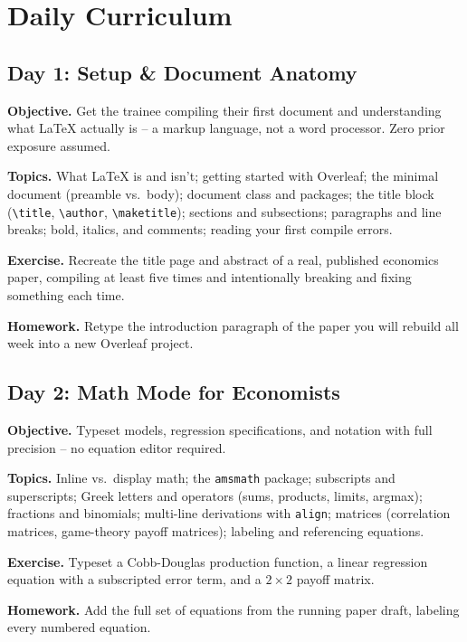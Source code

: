 \documentclass[11pt,a4paper]{article}
\begin{document}
\newpage
\section{Daily Curriculum}

\subsection*{Day 1: Setup \& Document Anatomy}
\textbf{Objective.} Get the trainee compiling their first document and
understanding what LaTeX actually is -- a markup language, not a word
processor. Zero prior exposure assumed.

\textbf{Topics.} What LaTeX is and isn't; getting started with
Overleaf; the minimal document (preamble vs.\ body); document class
and packages; the title block (\texttt{\textbackslash title},
\texttt{\textbackslash author}, \texttt{\textbackslash maketitle});
sections and subsections; paragraphs and line breaks; bold, italics,
and comments; reading your first compile errors.

\textbf{Exercise.} Recreate the title page and abstract of a real,
published economics paper, compiling at least five times and
intentionally breaking and fixing something each time.

\textbf{Homework.} Retype the introduction paragraph of the paper you
will rebuild all week into a new Overleaf project.

\vspace{6pt}
\subsection*{Day 2: Math Mode for Economists}
\textbf{Objective.} Typeset models, regression specifications, and
notation with full precision -- no equation editor required.

\textbf{Topics.} Inline vs.\ display math; the \texttt{amsmath}
package; subscripts and superscripts; Greek letters and operators
(sums, products, limits, argmax); fractions and binomials; multi-line
derivations with \texttt{align}; matrices (correlation matrices,
game-theory payoff matrices); labeling and referencing equations.

\textbf{Exercise.} Typeset a Cobb-Douglas production function, a
linear regression equation with a subscripted error term, and a
$2\times2$ payoff matrix.

\textbf{Homework.} Add the full set of equations from the running
paper draft, labeling every numbered equation.
\end{document}
